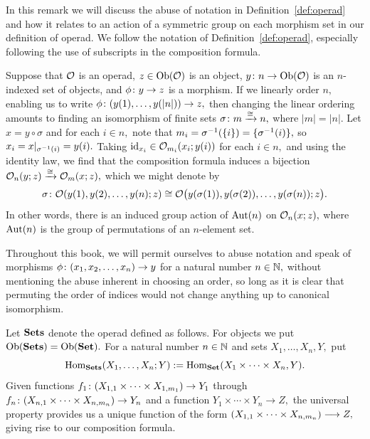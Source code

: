 \documentclass[CT4S-EN-RU]{subfiles}
\begin{document}
\begin{remarkENG}\label{rem:symmetry}
In this remark we will discuss the abuse of notation in Definition~\ref{def:operad} and how it relates to an action of a symmetric group on each morphism set in our definition of operad. We follow the notation of Definition~\ref{def:operad}, especially following the use of subscripts in the composition formula.

Suppose that $\mathcal{O}$ is an operad, $z\in\textnormal{Ob}(\mathcal{O})$ is an object, $y\colon n\rightarrow\textnormal{Ob}(\mathcal{O})$ is an $n$-indexed set of objects, and $\phi\colon y\rightarrow z$ is a morphism. If we linearly order $n,$ enabling us to write $\phi\colon (y(1),\ldots,y(|n|))\rightarrow z,$ then changing the linear ordering amounts to finding an isomorphism of finite sets $\sigma\colon m\xrightarrow{\cong} n,$ where $|m|=|n|.$ Let $x=y\circ\sigma$ and for each $i\in n,$ note that $m_i=\sigma^\m1(\{i\})=\{\sigma^\m1(i)\},$ so $x_i=x|_{\sigma^\m1(i)}=y(i).$ Taking $\textnormal{id}_{x_i}\in\mathcal{O}_{m_i}(x_i;y(i))$ for each $i\in n,$ and using the identity law, we find that the composition formula induces a bijection $\mathcal{O}_n(y;z)\xrightarrow{\cong}\mathcal{O}_m(x;z),$ which we might denote by 
$$\sigma\colon\mathcal{O}(y(1),y(2),\ldots,y(n);z)\cong\mathcal{O}\big(y(\sigma(1)),y(\sigma(2)),\ldots,y(\sigma(n));z\big).$$
In other words, there is an induced group action of $\textnormal{Aut}(n)$ on $\mathcal{O}_n(x;z),$ where $\textnormal{Aut}(n)$ is the group of permutations of an $n$-element set.

Throughout this book, we will permit ourselves to abuse notation and speak of morphisms $\phi\colon (x_1,x_2,\ldots,x_n)\rightarrow y$ for a natural number $n\in{\mathbb N},$ without mentioning the abuse inherent in choosing an order, so long as it is clear that permuting the order of indices would not change anything up to canonical isomorphism.
\end{remarkENG}

\begin{remarkRUS}\label{rem:symmetry}
\end{remarkRUS}

\begin{exampleENG}
Let ${\mathbf{Sets}}$ denote the operad defined as follows. For objects we put $\textnormal{Ob}({\mathbf{Sets}})=\textnormal{Ob}({\mathbf{Set}}).$ For a natural number $n\in{\mathbb N}$ and sets $X_1,\ldots,X_n,Y,$ put 
$$\textnormal{Hom}_{\mathbf{Sets}}(X_1,\ldots,X_n;Y):=\textnormal{Hom}_{\mathbf{Set}}(X_1\times\cdots\times X_n,Y).$$
Given functions $f_1\colon(X_{1,1}\times\cdots\times X_{1,m_1})\rightarrow Y_1$ through $f_n\colon (X_{n,1}\times\cdots\times X_{n,m_n})\rightarrow Y_n$ and a function $Y_1\times\cdots\times Y_n\to Z,$ the universal property provides us a unique function of the form $(X_{1,1}\times\cdots\times X_{n,m_n})\longrightarrow Z,$ giving rise to our composition formula.
\end{exampleENG}
\end{document}
